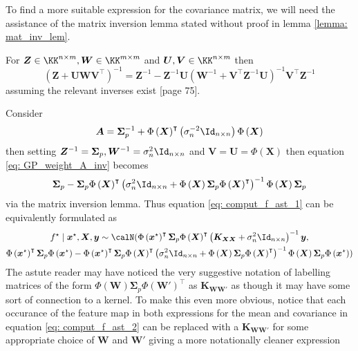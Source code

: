 To find a more suitable expression for the covariance matrix, we will need the assistance of the matrix inversion lemma stated without proof in lemma \ref{lemma: mat_inv_lem}.
\begin{lem} \label{lemma: mat_inv_lem}
    For $\bm{Z} \in \KK^{n \times m}, \bm{W} \in \KK^{m \times m}$ and $\bm{U},\bm{V} \in \KK^{n \times m}$ then
    \[
        \left( \bm{Z} + \bm{U} \bm{W} \bm{V}^{\intercal} \right)^{-1} = \bm{Z}^{-1} - \bm{Z}^{-1} \bm{U} \left( \bm{W}^{-1} + \bm{V}^{\intercal} \bm{Z}^{-1} \bm{U} \right)^{-1} \bm{V}^{\intercal} \bm{Z}^{-1}
    \]
    assuming the relevant inverses exist \cite{PressWilliamH.WilliamHenry1992NriC}[page 75].
\end{lem}
Consider
\begin{equation} \label{eq: GP_weight_A_inv}
    \bm{A} = \bm{\Sigma}_p^{-1} +  {\Phi \left( \bm{X} \right)}^{\intercal} \left( \sigma_n^{-2} \Id_{n \times n} \right) \Phi \left( \bm{X} \right)
\end{equation}
then setting $\bm{Z}^{-1} = \bm{\Sigma}_p, \bm{W}^{-1} = \sigma_n^{2} \Id_{n \times n}$ and $\bm{V} = \bm{U} = \Phi \left( \bm{X} \right)$ then equation \ref{eq: GP_weight_A_inv} becomes
\begin{equation*}
    \bm{\Sigma}_p - \bm{\Sigma}_p {\Phi \left( \bm{X} \right)}^{\intercal} \left( \sigma_n^{2} \Id_{n \times n} + \Phi \left( \bm{X} \right) \bm{\Sigma}_p {\Phi \left( \bm{X} \right)}^{\intercal} \right)^{-1} \Phi \left( \bm{X} \right) \bm{\Sigma}_p
\end{equation*}
via the matrix inversion lemma. Thus equation \ref{eq: comput_f_ast_1} can be equivalently formulated as
\begin{multline} \label{eq: comput_f_ast_2}
    f^{\star} \mid \bm{x}^{\star} , \bm{X} , \bm{y} \sim \calN ( \Phi \left( \bm{x}^{\star} \right)^{\intercal} \bm{\Sigma}_p {\Phi \left( \bm{X} \right)}^{\intercal} \left( \bm{K}_{\bm{X} \bm{X}} + \sigma_n^{2} \Id_{n \times n} \right)^{-1} \bm{y} , \\
    \Phi \left( \bm{x}^{\star} \right)^{\intercal} \bm{\Sigma}_p \Phi \left( \bm{x}^{\star} \right) - \Phi \left( \bm{x}^{\star} \right)^{\intercal} \bm{\Sigma}_p {\Phi \left( \bm{X} \right)}^{\intercal} \left( \sigma_n^{2} \Id_{n \times n} + \Phi \left( \bm{X} \right) \bm{\Sigma}_p {\Phi \left( \bm{X} \right)}^{\intercal} \right)^{-1} \Phi \left( \bm{X} \right) \bm{\Sigma}_p \Phi \left( \bm{x}^{\star} \right) )
\end{multline}
The astute reader may have noticed the very suggestive notation of labelling matrices of the form $\Phi \left( \bm{W} \right) \bm{\Sigma}_p {\Phi \left( \bm{W}' \right)}^{\intercal}$ as $\bm{K}_{\bm{W} \bm{W}'}$ as though it may have some sort of connection to a kernel. To make this even more obvious, notice that each occurance of the feature map in both expressions for the mean and covariance in equation \ref{eq: comput_f_ast_2} can be replaced with a $\bm{K}_{\bm{W} \bm{W}'}$ for some appropriate choice of $\bm{W}$ and $\bm{W}'$ giving a more notationally cleaner expression
